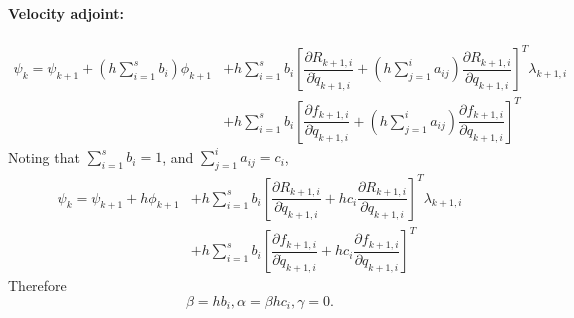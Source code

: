 \documentclass[10pt,letter]{book}
\newcommand{\pd}[2]{\dfrac{\partial #1}{\partial #2}}
\begin{document}
     \paragraph{Velocity adjoint:}

     \begin{equation}\nonumber
       \begin{split}
         \psi_k =  \psi_{k+1} + \left(h\sum_{i=1}^s b_i\right)
         \phi_{k+1} & + h \sum_{i=1}^sb_i
         \left[\pd{R_{k+1,i}}{\dot{q}_{k+1,i}} + \left( h \sum_{j=1}^i
           a_{ij} \right) \pd{R_{k+1,i}}{q_{k+1,i}} \right]^T
         \lambda_{k+1,i} \\ & + h \sum_{i=1}^sb_i
         \left[\pd{f_{k+1,i}}{\dot{q}_{k+1,i}} + \left( h \sum_{j=1}^i
           a_{ij} \right) \pd{f_{k+1,i}}{q_{k+1,i}} \right]^T
       \end{split}
     \end{equation}
     Noting that $\sum_{i=1}^s b_i = 1$, and $\sum_{j=1}^i a_{ij} = c_i$,
     \begin{equation}\nonumber
       \begin{split}
         \psi_k =  \psi_{k+1} + h \phi_{k+1}  & + h \sum_{i=1}^sb_i \left[\pd{R_{k+1,i}}{\dot{q}_{k+1,i}} + hc_i \pd{R_{k+1,i}}{q_{k+1,i}} \right]^T \lambda_{k+1,i}  \\ &+ h \sum_{i=1}^sb_i \left[\pd{f_{k+1,i}}{\dot{q}_{k+1,i}} +hc_i \pd{f_{k+1,i}}{q_{k+1,i}} \right]^T
       \end{split}
     \end{equation}
     Therefore  $$\beta = hb_i, \alpha = \beta hc_i, \gamma = 0.$$
\end{document}
